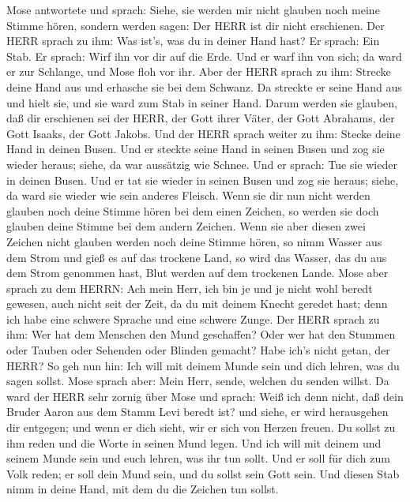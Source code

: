  Mose antwortete und sprach: Siehe, sie werden mir nicht
glauben noch meine Stimme hören, sondern werden sagen: Der HERR ist dir
nicht erschienen.  Der HERR sprach zu ihm: Was ist's, was du
in deiner Hand hast? Er sprach: Ein Stab.  Er sprach: Wirf
ihn vor dir auf die Erde. Und er warf ihn von sich; da ward er zur
Schlange, und Mose floh vor ihr.  Aber der HERR sprach zu
ihm: Strecke deine Hand aus und erhasche sie bei dem Schwanz. Da
streckte er seine Hand aus und hielt sie, und sie ward zum Stab in
seiner Hand.  Darum werden sie glauben, daß dir erschienen
sei der HERR, der Gott ihrer Väter, der Gott Abrahams, der Gott Isaaks,
der Gott Jakobs.  Und der HERR sprach weiter zu ihm: Stecke
deine Hand in deinen Busen. Und er steckte seine Hand in seinen Busen
und zog sie wieder heraus; siehe, da war aussätzig wie Schnee.
 Und er sprach: Tue sie wieder in deinen Busen. Und er tat
sie wieder in seinen Busen und zog sie heraus; siehe, da ward sie wieder
wie sein anderes Fleisch.  Wenn sie dir nun nicht werden
glauben noch deine Stimme hören bei dem einen Zeichen, so werden sie
doch glauben deine Stimme bei dem andern Zeichen.  Wenn sie
aber diesen zwei Zeichen nicht glauben werden noch deine Stimme hören,
so nimm Wasser aus dem Strom und gieß es auf das trockene Land, so wird
das Wasser, das du aus dem Strom genommen hast, Blut werden auf dem
trockenen Lande.  Mose aber sprach zu dem HERRN: Ach mein
Herr, ich bin je und je nicht wohl beredt gewesen, auch nicht seit der
Zeit, da du mit deinem Knecht geredet hast; denn ich habe eine schwere
Sprache und eine schwere Zunge.  Der HERR sprach zu ihm:
Wer hat dem Menschen den Mund geschaffen? Oder wer hat den Stummen oder
Tauben oder Sehenden oder Blinden gemacht? Habe ich's nicht getan, der
HERR?  So geh nun hin: Ich will mit deinem Munde sein und
dich lehren, was du sagen sollst.  Mose sprach aber: Mein
Herr, sende, welchen du senden willst.  Da ward der HERR
sehr zornig über Mose und sprach: Weiß ich denn nicht, daß dein Bruder
Aaron aus dem Stamm Levi beredt ist? und siehe, er wird herausgehen dir
entgegen; und wenn er dich sieht, wir er sich von Herzen freuen.
 Du sollst zu ihm reden und die Worte in seinen Mund legen.
Und ich will mit deinem und seinem Munde sein und euch lehren, was ihr
tun sollt.  Und er soll für dich zum Volk reden; er soll
dein Mund sein, und du sollst sein Gott sein.  Und diesen
Stab nimm in deine Hand, mit dem du die Zeichen tun sollst.
